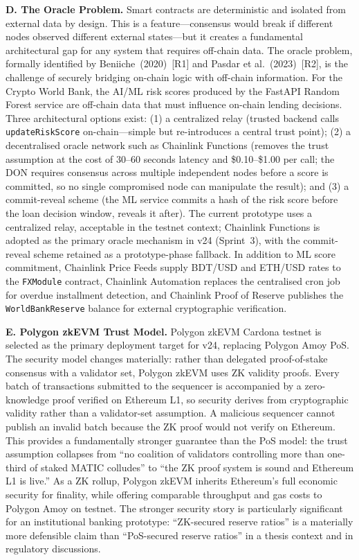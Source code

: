 \documentclass[12pt,a4paper]{report}
\begin{document}
\textbf{D. The Oracle Problem.}
Smart contracts are deterministic and isolated from external data by design. This is a feature---consensus would break if different nodes observed different external states---but it creates a fundamental architectural gap for any system that requires off-chain data. The oracle problem, formally identified by Beniiche~(2020)~[R1] and Pasdar et al.~(2023)~[R2], is the challenge of securely bridging on-chain logic with off-chain information. For the Crypto World Bank, the AI/ML risk scores produced by the FastAPI Random Forest service are off-chain data that must influence on-chain lending decisions. Three architectural options exist: (1) a centralized relay (trusted backend calls \texttt{updateRiskScore} on-chain---simple but re-introduces a central trust point); (2) a decentralised oracle network such as Chainlink Functions (removes the trust assumption at the cost of 30--60 seconds latency and \$0.10--\$1.00 per call; the DON requires consensus across multiple independent nodes before a score is committed, so no single compromised node can manipulate the result); and (3) a commit-reveal scheme (the ML service commits a hash of the risk score before the loan decision window, reveals it after). The current prototype uses a centralized relay, acceptable in the testnet context; Chainlink Functions is adopted as the primary oracle mechanism in v24 (Sprint~3), with the commit-reveal scheme retained as a prototype-phase fallback. In addition to ML score commitment, Chainlink Price Feeds supply BDT/USD and ETH/USD rates to the \texttt{FXModule} contract, Chainlink Automation replaces the centralised cron job for overdue installment detection, and Chainlink Proof of Reserve publishes the \texttt{WorldBankReserve} balance for external cryptographic verification.

\textbf{E. Polygon zkEVM Trust Model.}
Polygon zkEVM Cardona testnet is selected as the primary deployment target for v24, replacing Polygon Amoy PoS. The security model changes materially: rather than delegated proof-of-stake consensus with a validator set, Polygon zkEVM uses ZK validity proofs. Every batch of transactions submitted to the sequencer is accompanied by a zero-knowledge proof verified on Ethereum L1, so security derives from cryptographic validity rather than a validator-set assumption. A malicious sequencer cannot publish an invalid batch because the ZK proof would not verify on Ethereum. This provides a fundamentally stronger guarantee than the PoS model: the trust assumption collapses from ``no coalition of validators controlling more than one-third of staked MATIC colludes'' to ``the ZK proof system is sound and Ethereum L1 is live.'' As a ZK rollup, Polygon zkEVM inherits Ethereum's full economic security for finality, while offering comparable throughput and gas costs to Polygon Amoy on testnet. The stronger security story is particularly significant for an institutional banking prototype: ``ZK-secured reserve ratios'' is a materially more defensible claim than ``PoS-secured reserve ratios'' in a thesis context and in regulatory discussions.
\end{document}
